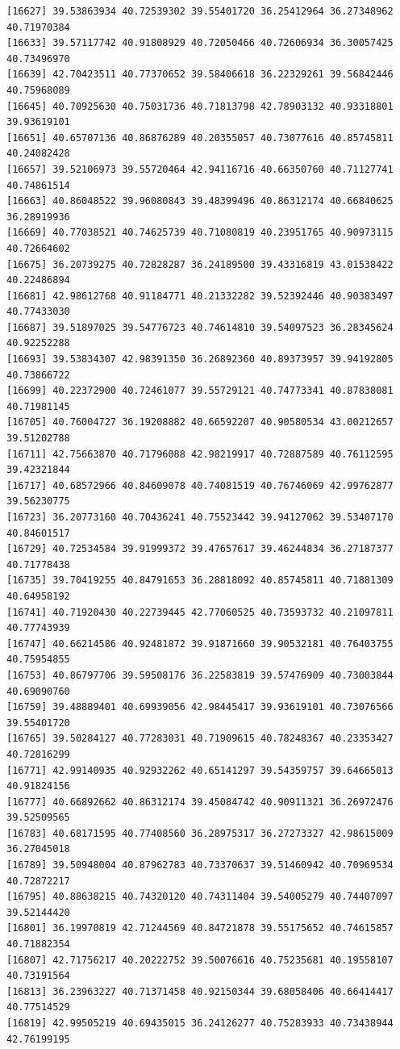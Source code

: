 \documentclass[
  letterpaper,
  DIV=11,
  numbers=noendperiod]{scrartcl}
\begin{document}
\begin{verbatim}
[16627] 39.53863934 40.72539302 39.55401720 36.25412964 36.27348962 40.71970384
[16633] 39.57117742 40.91808929 40.72050466 40.72606934 36.30057425 40.73496970
[16639] 42.70423511 40.77370652 39.58406618 36.22329261 39.56842446 40.75968089
[16645] 40.70925630 40.75031736 40.71813798 42.78903132 40.93318801 39.93619101
[16651] 40.65707136 40.86876289 40.20355057 40.73077616 40.85745811 40.24082428
[16657] 39.52106973 39.55720464 42.94116716 40.66350760 40.71127741 40.74861514
[16663] 40.86048522 39.96080843 39.48399496 40.86312174 40.66840625 36.28919936
[16669] 40.77038521 40.74625739 40.71080819 40.23951765 40.90973115 40.72664602
[16675] 36.20739275 40.72828287 36.24189500 39.43316819 43.01538422 40.22486894
[16681] 42.98612768 40.91184771 40.21332282 39.52392446 40.90383497 40.77433030
[16687] 39.51897025 39.54776723 40.74614810 39.54097523 36.28345624 40.92252288
[16693] 39.53834307 42.98391350 36.26892360 40.89373957 39.94192805 40.73866722
[16699] 40.22372900 40.72461077 39.55729121 40.74773341 40.87838081 40.71981145
[16705] 40.76004727 36.19208882 40.66592207 40.90580534 43.00212657 39.51202788
[16711] 42.75663870 40.71796088 42.98219917 40.72887589 40.76112595 39.42321844
[16717] 40.68572966 40.84609078 40.74081519 40.76746069 42.99762877 39.56230775
[16723] 36.20773160 40.70436241 40.75523442 39.94127062 39.53407170 40.84601517
[16729] 40.72534584 39.91999372 39.47657617 39.46244834 36.27187377 40.71778438
[16735] 39.70419255 40.84791653 36.28818092 40.85745811 40.71881309 40.64958192
[16741] 40.71920430 40.22739445 42.77060525 40.73593732 40.21097811 40.77743939
[16747] 40.66214586 40.92481872 39.91871660 39.90532181 40.76403755 40.75954855
[16753] 40.86797706 39.59508176 36.22583819 39.57476909 40.73003844 40.69090760
[16759] 39.48889401 40.69939056 42.98445417 39.93619101 40.73076566 39.55401720
[16765] 39.50284127 40.77283031 40.71909615 40.78248367 40.23353427 40.72816299
[16771] 42.99140935 40.92932262 40.65141297 39.54359757 39.64665013 40.91824156
[16777] 40.66892662 40.86312174 39.45084742 40.90911321 36.26972476 39.52509565
[16783] 40.68171595 40.77408560 36.28975317 36.27273327 42.98615009 36.27045018
[16789] 39.50948004 40.87962783 40.73370637 39.51460942 40.70969534 40.72872217
[16795] 40.88638215 40.74320120 40.74311404 39.54005279 40.74407097 39.52144420
[16801] 36.19970819 42.71244569 40.84721878 39.55175652 40.74615857 40.71882354
[16807] 42.71756217 40.20222752 39.50076616 40.75235681 40.19558107 40.73191564
[16813] 36.23963227 40.71371458 40.92150344 39.68058406 40.66414417 40.77514529
[16819] 42.99505219 40.69435015 36.24126277 40.75283933 40.73438944 42.76199195

\end{verbatim}
\end{document}
